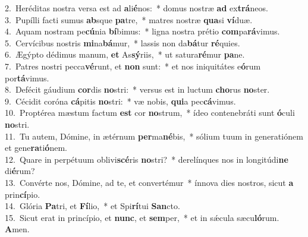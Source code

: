 {2.~}Heréditas nostra versa est ad \textbf{a}li\textbf{é}nos:~* domus nostræ \textbf{ad} ex\textbf{trá}neos.\\
{3.~}Pupílli facti sumus \textbf{ab}sque \textbf{pa}tre,~* matres nostræ \textbf{qua}si \textbf{ví}duæ.\\
{4.~}Aquam nostram pe\textbf{cú}nia \textbf{bí}bimus:~* ligna nostra prétio \textbf{com}pa\textbf{rá}vimus.\\
{5.~}Cervícibus nostris \textbf{mi}na\textbf{bá}mur,~* lassis non da\textbf{bá}tur \textbf{ré}quies.\\
{6.~}Ægýpto dédimus manum, \textbf{et} As\textbf{sý}riis,~* ut satura\textbf{ré}mur \textbf{pa}ne.\\
{7.~}Patres nostri pecca\textbf{vé}runt, et \textbf{non} sunt:~* et nos iniquitátes e\textbf{ó}rum por\textbf{tá}vimus.\\
{8.~}Defécit gáudium \textbf{cor}dis \textbf{no}stri:~* versus est in luctum \textbf{cho}rus \textbf{no}ster.\\
{9.~}Cécidit coróna \textbf{cá}pitis \textbf{no}stri:~* væ nobis, \textbf{qui}a pec\textbf{cá}vimus.\\
{10.~}Proptérea mæstum factum \textbf{est} cor \textbf{no}strum,~* ídeo contenebráti sunt \textbf{ó}culi \textbf{no}stri.\\
{11.~}Tu autem, Dómine, in ætérnum \textbf{per}ma\textbf{né}bis,~* sólium tuum in generatiónem et gene\textbf{ra}ti\textbf{ó}nem.\\
{12.~}Quare in perpétuum oblivi\textbf{scé}ris \textbf{no}stri?~* derelínques nos in longitúdi\textbf{ne} di\textbf{é}rum?\\
{13.~}Convérte nos, Dómine, ad te, et convertémur~* ínnova dies nostros, sicut \textbf{a} prin\textbf{cí}pio.\\
{14.~}Glória \textbf{Pa}tri, et \textbf{Fí}lio,~* et Spi\textbf{rí}tui \textbf{San}cto.\\
{15.~}Sicut erat in princípio, et \textbf{nunc}, et \textbf{sem}per,~* et in sǽcula sæcu\textbf{ló}rum. \textbf{A}men.\\
